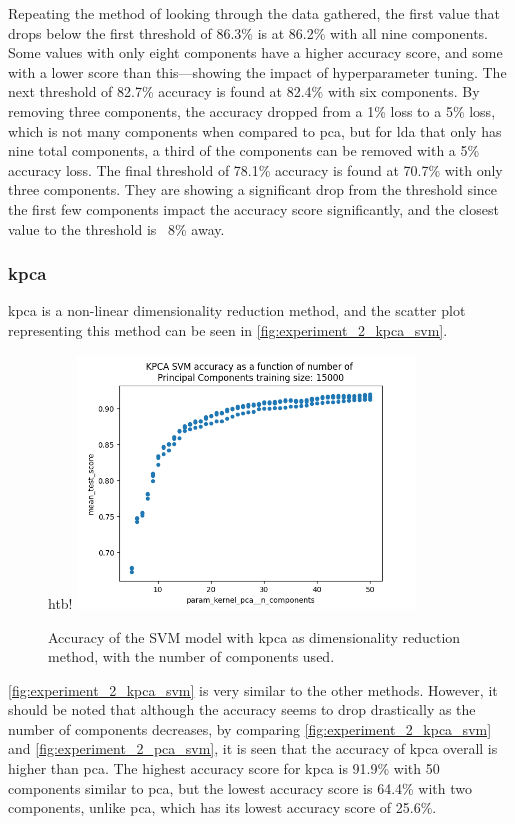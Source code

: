 Repeating the method of looking through the data gathered, the first value that drops below the first threshold of 86.3\% is at 86.2\% with all nine components. Some values with only eight components have a higher accuracy score, and some with a lower score than this—showing the impact of hyperparameter tuning.
The next threshold of 82.7\% accuracy is found at 82.4\% with six components. By removing three components, the accuracy dropped from a 1\% loss to a 5\% loss, which is not many components when compared to \gls{pca}, but for \gls{lda} that only has nine total components, a third of the components can be removed with a 5\% accuracy loss.
The final threshold of 78.1\% accuracy is found at 70.7\% with only three components. They are showing a significant drop from the threshold since the first few components impact the accuracy score significantly, and the closest value to the threshold is ~8\% away.


\subsubsection{\gls{kpca}}\label{subsubsec:experiment_2_kpca}
\gls{kpca} is a non-linear dimensionality reduction method, and the scatter plot representing this method can be seen in \autoref{fig:experiment_2_kpca_svm}.

\begin{figure}{htb!}
    \centering
    \includegraphics[width=0.8\textwidth]{figures/experiment_two/kpca_svm_15000.png}
    \caption{Accuracy of the SVM model with \gls{kpca} as dimensionality reduction method, with the number of components used.}
    \label{fig:experiment_2_kpca_svm}
\end{figure}

\autoref{fig:experiment_2_kpca_svm} is very similar to the other methods. However, it should be noted that although the accuracy seems to drop drastically as the number of components decreases, by comparing \autoref{fig:experiment_2_kpca_svm} and \autoref{fig:experiment_2_pca_svm}, it is seen that the accuracy of \gls{kpca} overall is higher than \gls{pca}. The highest accuracy score for \gls{kpca} is 91.9\% with 50 components similar to \gls{pca}, but the lowest accuracy score is 64.4\% with two components, unlike \gls{pca}, which has its lowest accuracy score of 25.6\%.

